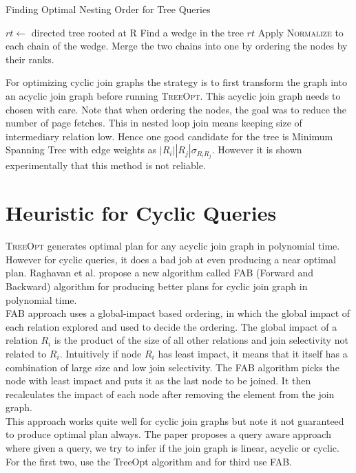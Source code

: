 \begin{algorithm}
  \caption{Finding Optimal Nesting Order for Tree Queries
    \label{alg:treeopt}}
	\begin{algorithmic}[1]
		\State $rt \gets$ directed tree rooted at R   
			\State Find a wedge in the tree $rt$
			\State Apply \textsc{Normalize} to each chain of the wedge.
			\State Merge the two chains into one by ordering the nodes by their ranks.		
		\EndWhile
	\EndFunction
  \end{algorithmic}
\end{algorithm}

For optimizing cyclic join graphs the strategy is to first transform the graph into an acyclic join graph before running \textsc{TreeOpt}. This acyclic join graph needs to chosen with care. Note that when ordering the nodes, the goal was to reduce the number of page fetches. This in nested loop join means keeping size of intermediary relation low. Hence one good candidate for the tree is Minimum Spanning Tree with edge weights as $|R_{i}||R_{j}| \sigma_{R_{i}R_{j}}$. However it is shown experimentally that this method is not reliable.

\section{Heuristic for Cyclic Queries}
\textsc{TreeOpt} generates optimal plan for any acyclic join graph in polynomial time. However for cyclic queries, it does a bad job at even producing a near optimal plan. Raghavan et al. \cite{raghavan2009multi} propose a new algorithm called FAB (Forward and Backward) algorithm for producing better plans for cyclic join graph in polynomial time. \\

FAB approach uses a global-impact based ordering, in which the global impact of each relation explored and used to decide the ordering. The global impact of a  relation $R_{i}$ is the product of the size of all other relations and join selectivity not related to $R_{i}$. Intuitively if node $R_{i}$ has least impact, it means that it itself has a combination of large size and low join selectivity. The FAB algorithm picks the node with least impact and puts it as the last node to be joined. It then recalculates the impact of each node after removing the element from the join graph. \\

This approach works quite well for cyclic join graphs but note it not guaranteed to produce optimal plan always. The paper proposes a query aware approach where given a query, we try to infer if the join graph is linear, acyclic or cyclic. For the first two, use the TreeOpt algorithm and for third use FAB. \\

